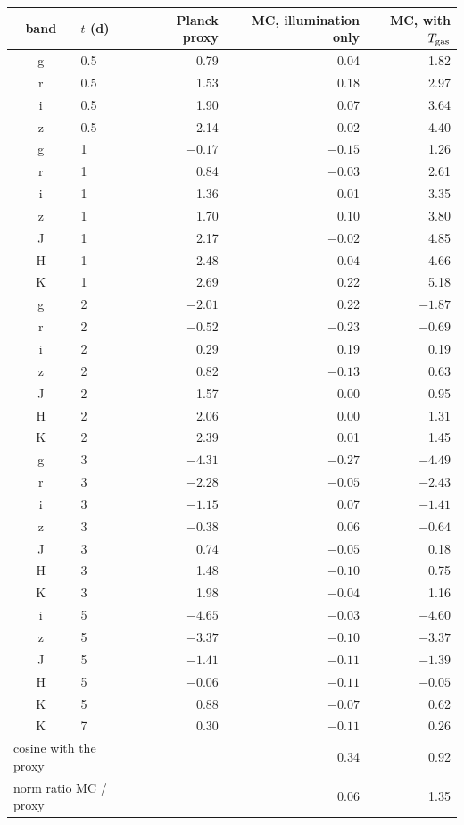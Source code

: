 \begin{tabular}{clrrr}
\toprule
band & $t$ (d) & Planck proxy & MC, illumination only & MC, with $T_{\rm gas}$ \\
\midrule
g & 0.5 & 0.79 & 0.04 & 1.82 \\
r & 0.5 & 1.53 & 0.18 & 2.97 \\
i & 0.5 & 1.90 & 0.07 & 3.64 \\
z & 0.5 & 2.14 & $-0.02$ & 4.40 \\
g & 1 & $-0.17$ & $-0.15$ & 1.26 \\
r & 1 & 0.84 & $-0.03$ & 2.61 \\
i & 1 & 1.36 & 0.01 & 3.35 \\
z & 1 & 1.70 & 0.10 & 3.80 \\
J & 1 & 2.17 & $-0.02$ & 4.85 \\
H & 1 & 2.48 & $-0.04$ & 4.66 \\
K & 1 & 2.69 & 0.22 & 5.18 \\
g & 2 & $-2.01$ & 0.22 & $-1.87$ \\
r & 2 & $-0.52$ & $-0.23$ & $-0.69$ \\
i & 2 & 0.29 & 0.19 & 0.19 \\
z & 2 & 0.82 & $-0.13$ & 0.63 \\
J & 2 & 1.57 & 0.00 & 0.95 \\
H & 2 & 2.06 & 0.00 & 1.31 \\
K & 2 & 2.39 & 0.01 & 1.45 \\
g & 3 & $-4.31$ & $-0.27$ & $-4.49$ \\
r & 3 & $-2.28$ & $-0.05$ & $-2.43$ \\
i & 3 & $-1.15$ & 0.07 & $-1.41$ \\
z & 3 & $-0.38$ & 0.06 & $-0.64$ \\
J & 3 & 0.74 & $-0.05$ & 0.18 \\
H & 3 & 1.48 & $-0.10$ & 0.75 \\
K & 3 & 1.98 & $-0.04$ & 1.16 \\
i & 5 & $-4.65$ & $-0.03$ & $-4.60$ \\
z & 5 & $-3.37$ & $-0.10$ & $-3.37$ \\
J & 5 & $-1.41$ & $-0.11$ & $-1.39$ \\
H & 5 & $-0.06$ & $-0.11$ & $-0.05$ \\
K & 5 & 0.88 & $-0.07$ & 0.62 \\
K & 7 & 0.30 & $-0.11$ & 0.26 \\
\multicolumn{2}{l}{cosine with the proxy} &  & 0.34 & 0.92 \\
\multicolumn{2}{l}{norm ratio MC / proxy} &  & 0.06 & 1.35 \\
\bottomrule
\end{tabular}
